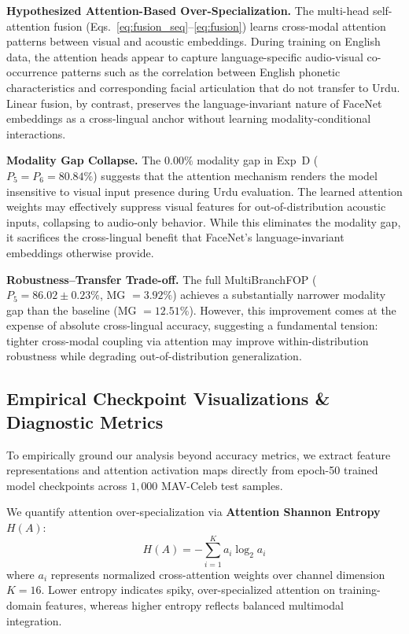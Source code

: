 \documentclass[conference]{IEEEtran}
\begin{document}
\textbf{Hypothesized Attention-Based Over-Specialization.}
The multi-head self-attention fusion (Eqs.~\ref{eq:fusion_seq}--\ref{eq:fusion})
learns cross-modal attention patterns between visual and acoustic embeddings.
During training on English data, the attention heads appear to capture
language-specific audio-visual co-occurrence patterns such as the correlation
between English phonetic characteristics and corresponding facial
articulation that do not transfer to Urdu.
Linear fusion, by contrast, preserves the language-invariant nature of FaceNet
embeddings as a cross-lingual anchor without learning modality-conditional
interactions.

\textbf{Modality Gap Collapse.}
The $0.00\%$ modality gap in Exp~D ($P_5 = P_6 = 80.84\%$) suggests that the
attention mechanism renders the model insensitive to visual input presence
during Urdu evaluation.
The learned attention weights may effectively suppress visual features for
out-of-distribution acoustic inputs, collapsing to audio-only behavior.
While this eliminates the modality gap, it sacrifices the cross-lingual benefit
that FaceNet's language-invariant embeddings otherwise provide.

\textbf{Robustness--Transfer Trade-off.}
The full MultiBranchFOP ($P_5 = 86.02 \pm 0.23\%$, MG $= 3.92\%$) achieves a
substantially narrower modality gap than the baseline (MG $= 12.51\%$).
However, this improvement comes at the expense of absolute cross-lingual
accuracy, suggesting a fundamental tension: tighter cross-modal coupling
via attention may improve within-distribution robustness while degrading
out-of-distribution generalization.
\subsection{Empirical Checkpoint Visualizations \& Diagnostic Metrics}
\label{sec:empirical_diagnostics}

To empirically ground our analysis beyond accuracy metrics, we extract feature representations and attention activation maps directly from epoch-50 trained model checkpoints across $1,000$ MAV-Celeb test samples.

We quantify attention over-specialization via \textbf{Attention Shannon Entropy} $H(A)$:
\begin{equation}
H(A) = -\sum_{i=1}^{K} a_i \log_2 a_i
\label{eq:attention_entropy}
\end{equation}
where $a_i$ represents normalized cross-attention weights over channel dimension $K=16$. Lower entropy indicates spiky, over-specialized attention on training-domain features, whereas higher entropy reflects balanced multimodal integration.
\end{document}
